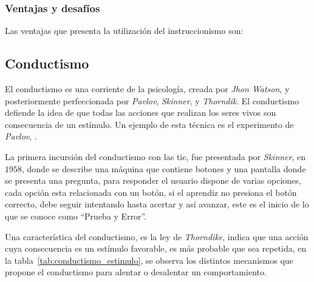 \subsubsection{Ventajas y desafíos}

Las ventajas que presenta la utilización del instruccionismo son:

\subsection{Conductismo}

El conductismo es una corriente de la psicología, creada por \textit{Jhon
    Watson}, y posteriormente perfeccionada por \textit{Pavlov},
\textit{Skinner}, y \textit{Thorndik}. El conductismo defiende la idea de que
todas las acciones que realizan los seres vivos son consecuencia de un estímulo.
Un ejemplo de esta técnica es el experimento de \textit{Pavlov}, \cite{weegar2012comparison}.


La primera incursión del conductismo con las \Gls{tic}, fue presentada por
\textit{Skinner}, en $1958$\cite{weegar2012comparison}, donde se describe una
máquina que contiene botones y una pantalla donde se presenta una pregunta,
para responder el usuario dispone de varias opciones, cada opción esta
relacionada con un botón, si el aprendiz no presiona el botón correcto, debe
seguir intentando hasta acertar y así avanzar\cite{weegar2012comparison}, este
es el inicio de lo que se conoce como \enquote{Prueba y Error}.

Una característica del conductismo, es la ley de \textit{Thorndike}, indica que
una acción cuya consecuencia es un estímulo favorable, es más probable que sea
repetida\cite{weegar2012comparison}, en la
tabla~\ref{tab:conductismo_estimulo}, se observa los distintos mecanismos 
que propone el conductismo para alentar o desalentar un comportamiento.

